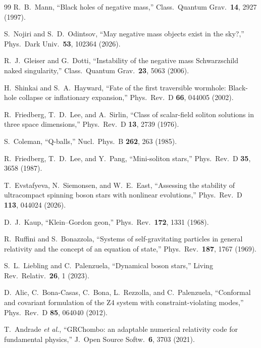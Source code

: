 \documentclass[twocolumn,floatfix,aps,prd,superscriptaddress,nofootinbib]{revtex4-2}
\begin{document}
\begin{thebibliography}{99}
R.~B.~Mann,
\newblock ``Black holes of negative mass,''
\newblock Class.\ Quantum Grav.\ \textbf{14}, 2927 (1997).

S.~Nojiri and S.~D.~Odintsov,
\newblock ``May negative mass objects exist in the sky?,''
\newblock Phys.\ Dark Univ.\ \textbf{53}, 102364 (2026).

R.~J.~Gleiser and G.~Dotti,
\newblock ``Instability of the negative mass Schwarzschild naked singularity,''
\newblock Class.\ Quantum Grav.\ \textbf{23}, 5063 (2006).

H.~Shinkai and S.~A.~Hayward,
\newblock ``Fate of the first traversible wormhole: Black-hole collapse or inflationary expansion,''
\newblock Phys.\ Rev.\ D \textbf{66}, 044005 (2002).

R.~Friedberg, T.~D.~Lee, and A.~Sirlin,
\newblock ``Class of scalar-field soliton solutions in three space dimensions,''
\newblock Phys.\ Rev.\ D \textbf{13}, 2739 (1976).

S.~Coleman,
\newblock ``Q-balls,''
\newblock Nucl.\ Phys.\ B \textbf{262}, 263 (1985).

R.~Friedberg, T.~D.~Lee, and Y.~Pang,
\newblock ``Mini-soliton stars,''
\newblock Phys.\ Rev.\ D \textbf{35}, 3658 (1987).

T.~Evstafyeva, N.~Siemonsen, and W.~E.~East,
\newblock ``Assessing the stability of ultracompact spinning boson stars with nonlinear evolutions,''
\newblock Phys.\ Rev.\ D \textbf{113}, 044024 (2026).

D.~J.~Kaup,
\newblock ``Klein--Gordon geon,''
\newblock Phys.\ Rev.\ \textbf{172}, 1331 (1968).

R.~Ruffini and S.~Bonazzola,
\newblock ``Systems of self-gravitating particles in general relativity and the concept of an equation of state,''
\newblock Phys.\ Rev.\ \textbf{187}, 1767 (1969).

S.~L.~Liebling and C.~Palenzuela,
\newblock ``Dynamical boson stars,''
\newblock Living Rev.\ Relativ.\ \textbf{26}, 1 (2023).

D.~Alic, C.~Bona-Casas, C.~Bona, L.~Rezzolla, and C.~Palenzuela,
\newblock ``Conformal and covariant formulation of the Z4 system with constraint-violating modes,''
\newblock Phys.\ Rev.\ D \textbf{85}, 064040 (2012).

T.~Andrade \emph{et al.},
\newblock ``GRChombo: an adaptable numerical relativity code for fundamental physics,''
\newblock J.\ Open Source Softw.\ \textbf{6}, 3703 (2021).


\end{thebibliography}
\end{document}
